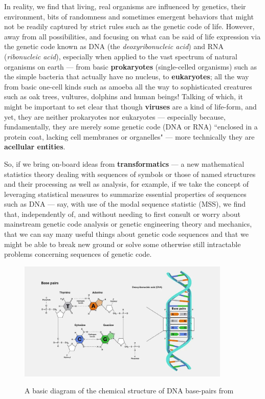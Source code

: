 \documentclass[a4paper, 18pt]{book} %
\begin{document}
In reality, we find that living, real organisms are influenced by genetics, their environment, bits of randomness and sometimes emergent behaviors that might not be readily captured by strict rules such as the genetic code of life. However, away from all possibilities, and focusing on what can be said of life expression via the genetic code known as DNA (the \textit{deoxyribonucleic acid}) and RNA (\textit{ribonucleic acid}), especially when applied to the vast spectrum of natural organisms on earth --- from basic \textbf{prokaryotes} (single-celled organisms) such as the simple bacteria that actually have no nucleus\cite{bioexplorer2025}, to  \textbf{eukaryotes}; all the way from basic one-cell kinds such as amoeba\cite{kang2017deep} all the way to sophisticated creatures such as oak trees, vultures, dolphins and human beings! Talking of which, it might be important to set clear that though \textbf{viruses} are a kind of life-form\cite{libretexts2025viruses}, and yet, they are neither prokaryotes nor eukaryotes --- especially because, fundamentally, they are merely some genetic code (DNA or RNA) ``enclosed in a protein coat, lacking cell membranes or organelles"\cite{libretexts2025viruses} --- more technically they are \textbf{acellular entities}.

So, if we bring on-board ideas from \textbf{transformatics}\cite{transformatics} --- a new mathematical statistics theory dealing with sequences of symbols or those of named structures and their processing as well as analysis, for example, if we take the concept of leveraging statistical measures to summarize essential properties of sequences such as DNA --- say, with use of the modal sequence statistic (MSS), we find that, independently of, and without needing to first consult or worry about mainstream genetic code analysis or genetic engineering theory and mechanics, that we can say many useful things about genetic code sequences and that we might be able to break new ground or solve some otherwise still intractable problems concerning sequences of genetic code.


\begin{figure}[H]
	\begin{center}
		\includegraphics[width=0.9\textwidth]{resources/images/dna_diagram.jpeg} \\
		\caption{A basic diagram of the chemical structure of DNA base-pairs from \cite{wikipedia_basepair}}
		\label{FIG1}
\end{center}
\end{figure}
    
\end{document}
